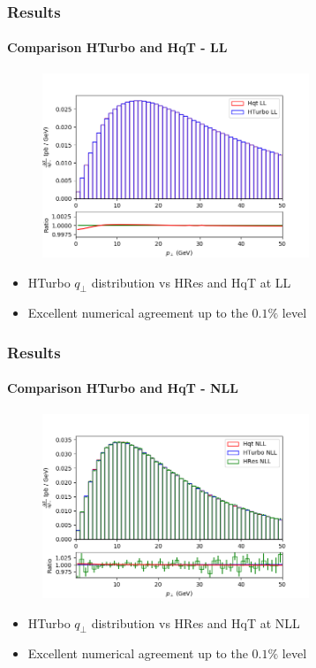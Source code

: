 \documentclass[aspectratio=43]{beamer}
\begin{document}
\begin{frame}
	
	\frametitle{Results}
	\framesubtitle{Comparison HTurbo and HqT - LL}
	
	\begin{figure}
		\includegraphics[width = 8cm]{plots/hturbo_LL.png}
	\end{figure}
	
	\begin{itemize}
		\item HTurbo $q_{\perp}$ distribution vs HRes and HqT at LL
		\item Excellent numerical agreement up to the $0.1\%$ level
	\end{itemize}

\end{frame}

\begin{frame}

	\frametitle{Results}
	\framesubtitle{Comparison HTurbo and HqT - NLL}
	
	\begin{figure}
		\includegraphics[width = 8cm]{plots/hturbo_NLL.png}
	\end{figure}
	
	\begin{itemize}
		\item HTurbo $q_{\perp}$ distribution vs HRes and HqT at NLL
		\item Excellent numerical agreement up to the $0.1\%$ level
	\end{itemize}

\end{frame}
\end{document}
